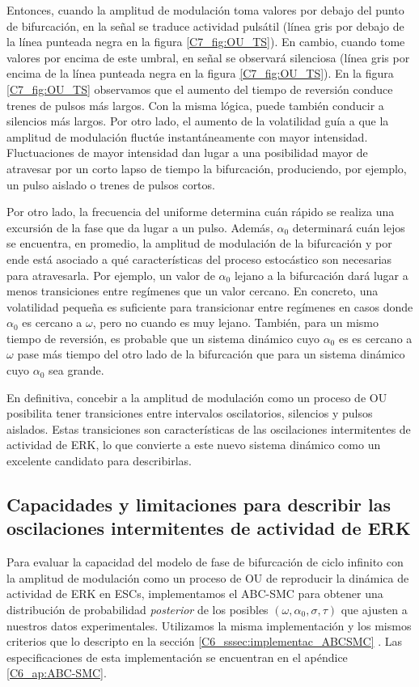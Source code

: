 \documentclass[./main.tex]{subfiles}
\begin{document}
Entonces, cuando la amplitud de modulación toma valores por debajo del punto de bifurcación, en la señal se traduce actividad pulsátil (línea gris por debajo de la línea punteada negra en la figura \ref{C7_fig:OU_TS}). En cambio, cuando tome valores por encima de este umbral, en señal se observará silenciosa (línea gris por encima de la línea punteada negra en la figura \ref{C7_fig:OU_TS}). En la figura \ref{C7_fig:OU_TS} observamos que el aumento del tiempo de reversión conduce trenes de pulsos más largos. Con la misma lógica, puede también conducir a silencios más largos. Por otro lado, el aumento de la volatilidad guía a que la amplitud de modulación fluctúe instantáneamente con mayor intensidad. Fluctuaciones de mayor intensidad dan lugar a una posibilidad mayor de atravesar por un corto lapso de tiempo la bifurcación, produciendo, por ejemplo, un pulso aislado o trenes de pulsos cortos.


Por otro lado, la frecuencia del uniforme determina cuán rápido se realiza una excursión de la fase que da lugar a un pulso. Además, $\alpha_0$ determinará cuán lejos se encuentra, en promedio, la amplitud de modulación de la bifurcación y por ende está asociado a qué características del proceso estocástico son necesarias para atravesarla. Por ejemplo, un valor de $\alpha_0$ lejano a la bifurcación dará lugar a menos transiciones entre regímenes que un valor cercano. En concreto, una volatilidad pequeña es suficiente para transicionar entre regímenes en casos donde $\alpha_0$ es cercano a $\omega$, pero no cuando es muy lejano. También, para un mismo tiempo de reversión, es probable que un sistema dinámico cuyo $\alpha_0$ es es cercano a $\omega$ pase más tiempo del otro lado de la bifurcación que para un sistema dinámico cuyo $\alpha_0$ sea grande.


En definitiva, concebir a la amplitud de modulación como un proceso de OU posibilita tener transiciones entre intervalos oscilatorios, silencios y pulsos aislados. Estas transiciones son características de las oscilaciones intermitentes de actividad de ERK, lo que convierte a este nuevo sistema dinámico como un excelente candidato para describirlas.


\subsection{Capacidades y limitaciones para describir las oscilaciones intermitentes de actividad de ERK}

Para evaluar la capacidad del modelo de fase de bifurcación de ciclo infinito con la amplitud de modulación como un proceso de OU de reproducir la dinámica de actividad de ERK en ESCs, implementamos el ABC-SMC para obtener una distribución de probabilidad \textit{posterior} de los posibles $(\omega,\alpha_0,\sigma,\tau)$ que ajusten a nuestros datos experimentales. Utilizamos la misma implementación y los mismos criterios que lo descripto en la sección \ref{C6_sssec:implementac_ABCSMC} . Las especificaciones de esta implementación se encuentran en el apéndice \ref{C6_ap:ABC-SMC}.
\end{document}
